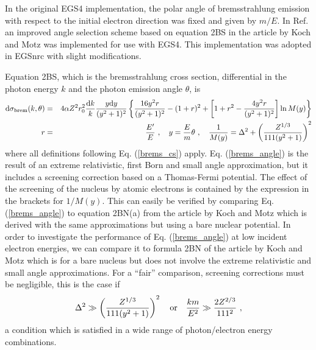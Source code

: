 In the original EGS4 implementation, the polar angle of bremsstrahlung 
emission with respect to the initial electron direction was fixed 
and given by $m/E$. In Ref. \cite{Bi89} an improved angle selection 
scheme based on equation 2BS in the article by Koch and Motz \cite{KM59} 
was implemented for use with EGS4. This implementation 
was adopted in EGSnrc with slight modifications. 

Equation 2BS, which is the bremsstrahlung cross section, 
differential in the photon energy 
$k$ and the photon emission angle $\theta$, is \cite{KM59}
\begin{eqnarray}
\label{brems_angle}
{\rm d}\sigma_{\rm brem}(k,\theta) & = & 4 \alpha Z^2 r_0^2 \frac{{\rm d}k}{k} 
{y {\rm d} y \over (y^2 + 1)^2} 
\left\{ {16 y^2 r \over (y^2 + 1)^2} - (1+r)^2 + \left[ 
1 + r^2 - {4 y^2 r \over (y^2 + 1)^2} \right] \ln M(y) \right\}
\nonumber \\
r & = & \frac{E'}{E}~, \quad y = \frac{E}{m} \theta~, \quad \frac{1}{M(y)} = 
\Delta^2 + \left( {Z^{1/3} \over 111 (y^2 + 1)} \right)^2
\end{eqnarray}
where all definitions following Eq. (\ref{brems_cs}) apply.
Eq. (\ref{brems_angle}) is the result of an extreme relativistic,  
first Born and small angle approximation, but it includes a 
screening correction 
based on a Thomas-Fermi potential. The effect of the screening 
of the nucleus by atomic electrons is contained by the 
expression in the brackets for $1/M(y)$. This can easily be 
verified by comparing Eq. (\ref{brems_angle}) to equation 
2BN(a) from the article by Koch and Motz which is derived 
with the same approximations but using a bare nuclear potential. 
In order to investigate the performance of 
Eq. (\ref{brems_angle}) at low incident electron energies, 
we can compare it to formula 
2BN of the article by Koch and Motz which is for a bare 
nucleus but does not involve the extreme relativistic 
and small angle 
approximations. For a ``fair'' comparison, screening corrections 
must be negligible, this is the case if
\begin{equation}
\Delta^2 \gg \left( {Z^{1/3} \over 111 (y^2 + 1)} \right)^2 \quad 
\mbox{or} \quad {k m \over E^2} \gg {2 Z^{2/3} \over 111^2}~,
\end{equation}
a condition which is satisfied in a wide range of photon/electron 
energy combinations. 
